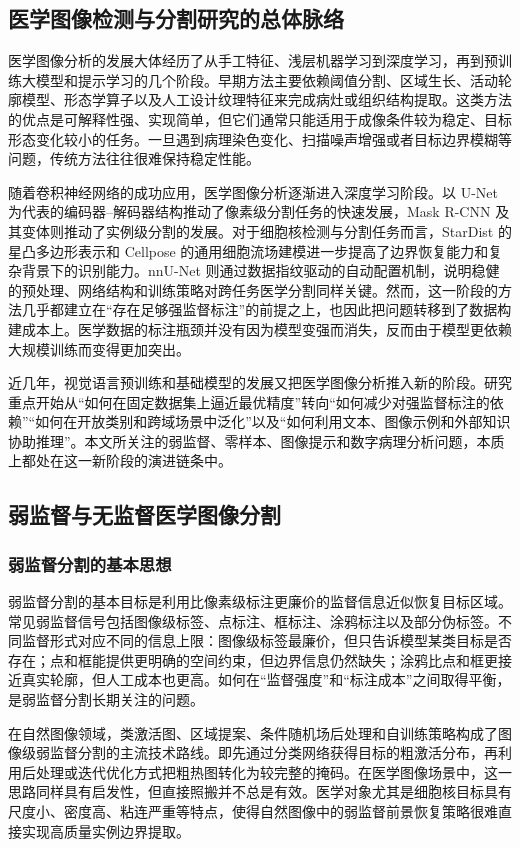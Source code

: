 \subsection{医学图像检测与分割研究的总体脉络}
医学图像分析的发展大体经历了从手工特征、浅层机器学习到深度学习，再到预训练大模型和提示学习的几个阶段。早期方法主要依赖阈值分割、区域生长、活动轮廓模型、形态学算子以及人工设计纹理特征来完成病灶或组织结构提取。这类方法的优点是可解释性强、实现简单，但它们通常只能适用于成像条件较为稳定、目标形态变化较小的任务。一旦遇到病理染色变化、扫描噪声增强或者目标边界模糊等问题，传统方法往往很难保持稳定性能。

随着卷积神经网络的成功应用，医学图像分析逐渐进入深度学习阶段。以 U-Net 为代表的编码器--解码器结构推动了像素级分割任务的快速发展\cite{ronneberger2015unet}，Mask R-CNN 及其变体则推动了实例级分割的发展\cite{he2017maskrcnn}。对于细胞核检测与分割任务而言，StarDist 的星凸多边形表示和 Cellpose 的通用细胞流场建模进一步提高了边界恢复能力和复杂背景下的识别能力\cite{schmidt2018stardist,stringer2021cellpose}。nnU-Net 则通过数据指纹驱动的自动配置机制，说明稳健的预处理、网络结构和训练策略对跨任务医学分割同样关键\cite{isensee2021nnunet}。然而，这一阶段的方法几乎都建立在“存在足够强监督标注”的前提之上，也因此把问题转移到了数据构建成本上。医学数据的标注瓶颈并没有因为模型变强而消失，反而由于模型更依赖大规模训练而变得更加突出。

近几年，视觉语言预训练和基础模型的发展又把医学图像分析推入新的阶段。研究重点开始从“如何在固定数据集上逼近最优精度”转向“如何减少对强监督标注的依赖”“如何在开放类别和跨域场景中泛化”以及“如何利用文本、图像示例和外部知识协助推理”。本文所关注的弱监督、零样本、图像提示和数字病理分析问题，本质上都处在这一新阶段的演进链条中。

\subsection{弱监督与无监督医学图像分割}
\subsubsection{弱监督分割的基本思想}
弱监督分割的基本目标是利用比像素级标注更廉价的监督信息近似恢复目标区域。常见弱监督信号包括图像级标签、点标注、框标注、涂鸦标注以及部分伪标签。不同监督形式对应不同的信息上限：图像级标签最廉价，但只告诉模型某类目标是否存在；点和框能提供更明确的空间约束，但边界信息仍然缺失；涂鸦比点和框更接近真实轮廓，但人工成本也更高。如何在“监督强度”和“标注成本”之间取得平衡，是弱监督分割长期关注的问题。

在自然图像领域，类激活图、区域提案、条件随机场后处理和自训练策略构成了图像级弱监督分割的主流技术路线。即先通过分类网络获得目标的粗激活分布，再利用后处理或迭代优化方式把粗热图转化为较完整的掩码。在医学图像场景中，这一思路同样具有启发性，但直接照搬并不总是有效。医学对象尤其是细胞核目标具有尺度小、密度高、粘连严重等特点，使得自然图像中的弱监督前景恢复策略很难直接实现高质量实例边界提取。

